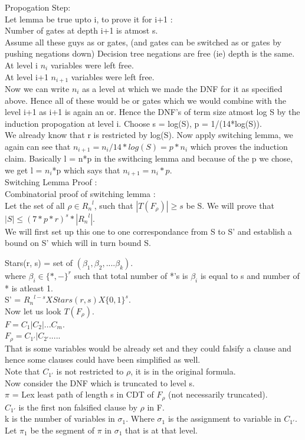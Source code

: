 \documentclass[solution,addpoints,12pt]{exam}
\begin{document}
Propogation Step:\\
Let lemma be true upto i, to prove it for i+1 :\\
Number of gates at depth i+1 is atmost s.\\
Assume all these guys as or gates, (and gates can be switched
as or gates by pushing negations down) Decision tree negations
are free (ie) depth is the same.
At level i $n_i$ variables were left free.\\
At level i+1 $n_{i+1}$ variables were left free.\\
Now we can write $n_i$ as a level at which we made the DNF for
it as specified above. Hence all of these would be or gates
which we would combine with the level i+1 as i+1
is again an or.
Hence the DNF's of term size atmost log S by the
induction propogation at level i. Choose s = log(S), p = 1/(14*log(S)).\\
We already know that r is restricted by log(S).
Now apply switching lemma, we again can see that
$n_{i+1} = n_i/14*log(S) = p*n_i$ which proves the induction claim.
Basically l = n*p in the swithcing lemma and
because of the p we chose, we get l = $n_i$*p which
says that $n_{i+1} = n_i*p$.\\

Switching Lemma Proof :\\
Combinatorial proof of switching lemma :\\
Let the set of all $\rho \in {R_n}^l$, such
that $|T(F_{\rho})| \ge s$ be S.
We will prove that $|S| \le {(7*p*r)}^s*|{R_n}^l|$.\\
We will first set up this one to one correspondance from
S to S' and establish a bound on S' which will in turn bound S.

Stars(r, s) = set of $(\beta_1, \beta_2, .... \beta_k)$.\\
where $\beta_i \in {\{*, -\}}^{r}$
such that total number of *'s is ${\beta}_i$ is equal to s and
number of * is atleast 1.\\
S' = ${R_n}^{l-s}XStars(r, s)X{\{0, 1\}}^s$.\\
Now let us look $T(F_{\rho})$.\\
$F = C_1 | C_2 | ... C_m$.\\
$F_{\rho} = C_{1'} | C_{2'} ....$.\\
That is some variables would be already set and they could
falsify a clause and hence some clauses could have been simplified as well.\\
Note that $C_{1'}$ is not restricted to $\rho$, it is in the original formula.\\
Now consider the DNF which is truncated to level s.\\
$\pi$ = Lex least path of length s in CDT of $F_{\rho}$ (not necessarily truncated).\\
$C_{1'}$ is the first non falsified clause by $\rho$ in F.\\
k is the number of variables in ${\sigma}_1$. Where ${\sigma}_1$
is the assignment to variable in $C_{1'}$.\\
Let $\pi_1$ be the segment of $\pi$ in $\sigma_1$ that is at that level.
\end{document}

